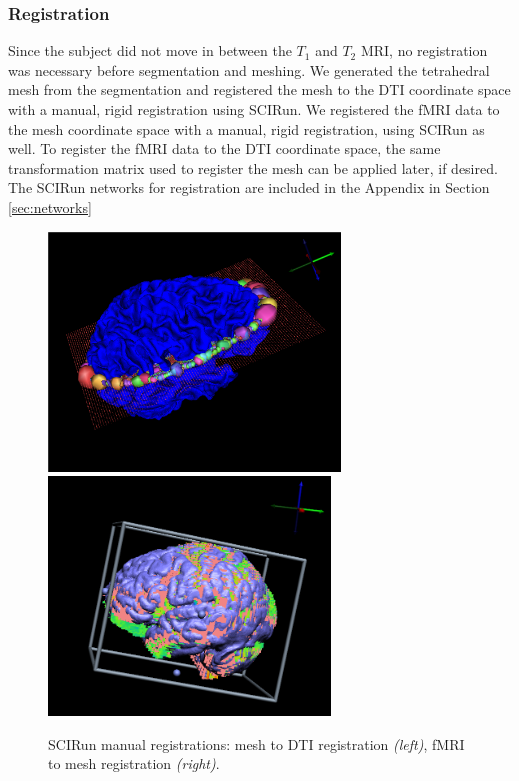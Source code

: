 \subsubsection{Registration}
\label{sec:reg}

Since the subject did not move in between the $T_1$ and $T_2$ MRI, no registration was necessary before segmentation and meshing. We generated the tetrahedral mesh from the segmentation and registered the mesh to the DTI coordinate space with a manual, rigid registration using SCIRun. We registered the fMRI data to the mesh coordinate space with a manual, rigid registration, using SCIRun as well. To register the fMRI data to the DTI coordinate space, the same transformation matrix used to register the mesh can be applied later, if desired. The SCIRun networks for registration are included in the Appendix in Section \ref{sec:networks}

\begin{figure}[H]
\begin{center}
\includegraphics[height = 2.5in]{Figures/DTI_reg}
\includegraphics[height = 2.5in]{Figures/fmri_reg}
\caption{SCIRun manual registrations: mesh to DTI registration \textit{(left)}, fMRI to mesh registration \textit{(right)}.}
\label{fig:dtireg}
\end{center}
\end{figure}

